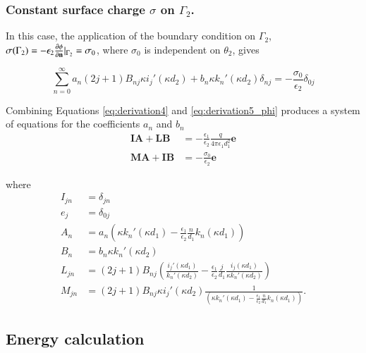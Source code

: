 \subsubsection*{Constant surface charge $\sigma$ on $\Gamma_2$.}
In this case, the application of the boundary condition on $\Gamma_2$, $\sigma(\Gamma_2) = -\epsilon_2 \frac{\partial \phi}{\partial \mathbf{n}} \Large|_{\Gamma_2} = \sigma_0$, where $\sigma_0$ is independent on $\theta_2$, gives

\begin{equation} \label{eq:derivation5_dphi}
\sum_{n=0}^{\infty} a_n(2j+1)B_{nj}\kappa i_j'(\kappa d_2) + b_n \kappa k_n'(\kappa d_2) \delta_{nj} = -\frac{\sigma_0}{\epsilon_2} \delta_{0j}
\end{equation}

\noindent Combining Equations \eqref{eq:derivation4} and  \eqref{eq:derivation5_phi} produces a system of equations for the coefficients $a_n$ and $b_n$
%
\begin{align} \label{eq:system_dphi}
\mathbf{I} \mathbf{A} + \mathbf{L} \mathbf{B} &= -\frac{\epsilon_1}{\epsilon_2} \frac{q}{4\pi\epsilon_1 d_1^2} \mathbf{e} \nonumber \\
\mathbf{M} \mathbf{A} + \mathbf{I} \mathbf{B} &= -\frac{\sigma_0}{\epsilon_2} \mathbf{e}
\end{align}

\noindent where
%
\begin{align} \label{eq:dphi_terms}
I_{jn} &= \delta_{jn} \nonumber \\
e_j &= \delta_{0j} \nonumber \\
A_n &= a_n \left(\kappa k_n'(\kappa d_1) - \frac{\epsilon_1}{\epsilon_2} \frac{n}{d_1} k_n(\kappa d_1) \right) \nonumber \\
B_n &= b_n \kappa k_n'(\kappa d_2) \nonumber \\
L_{jn} &= (2j+1)B_{nj}\left( \frac{i_j'(\kappa d_1)}{k_n'(\kappa d_2)} - \frac{\epsilon_1}{\epsilon_2} \frac{j}{d_1} \frac{i_j(\kappa d_1)}{\kappa k_n'(\kappa d_2)} \right) \nonumber \\
M_{jn} &= (2j+1)B_{nj} \kappa i_j'(\kappa d_2) \frac{1}{\left(\kappa k_n'(\kappa d_1) - \frac{\epsilon_1}{\epsilon_2} \frac{n}{d_1} k_n(\kappa d_1) \right)}. 
\end{align}
 
\subsection{Energy calculation} \label{energy_analytical}


